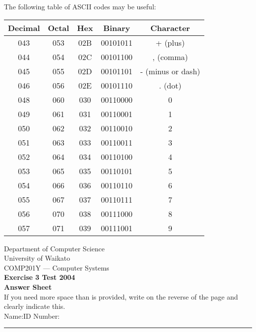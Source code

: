\documentclass[a4paper,10pt]{article}
\begin{document}
The following table of ASCII codes may be useful:
\begin{center}

\begin{tabular}{|c|c|c|c|c|}
\hline	
	Decimal	& Octal & Hex & Binary	& Character \\ \hline \hline
         043   &   053  &  02B &  00101011    &    +    (plus) \\ \hline 
         044   &   054  &  02C &  00101100    &    ,    (comma) \\ \hline 
         045   &   055  &  02D &  00101101    &    -    (minus or dash) \\ \hline 
         046   &   056  &  02E &  00101110    &    .    (dot) \\ \hline 
         048   &   060  &  030 &  00110000    &    0 \\ \hline 
         049   &   061  &  031 &  00110001    &    1 \\ \hline 
         050   &   062  &  032 &  00110010    &    2 \\ \hline 
         051   &   063  &  033 &  00110011    &    3 \\ \hline 
         052   &   064  &  034 &  00110100    &    4 \\ \hline 
         053   &   065  &  035 &  00110101    &    5 \\ \hline 
         054   &   066  &  036 &  00110110    &    6 \\ \hline 
         055   &   067  &  037 &  00110111    &    7 \\ \hline 
         056   &   070  &  038 &  00111000    &    8 \\ \hline 
         057   &   071  &  039 &  00111001    &    9 \\ \hline 

\end{tabular}
\end{center}



\clearpage
\newpage
\newpage
\newpage
\setcounter{page}{1} 

\vspace*{-1cm} 

{\centering
\Large 
Department of Computer Science\\
University of Waikato\\[5mm]
COMP201Y --- Computer Systems\\[5mm]
\bf Exercise 3 Test 2004\\
Answer Sheet\\[5mm]
}
If you need more space than is provided, write on the reverse of the
page and clearly indicate this.\\[5mm]
Name:\hspace*{5cm}ID Number:\\
\hrule
\end{document}
